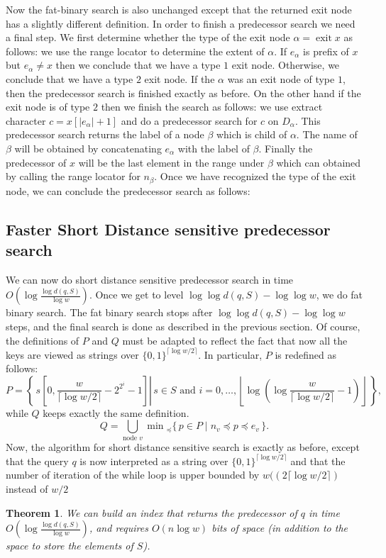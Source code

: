\documentclass[a4paper,11pt]{article}
\newtheorem{theorem}{Theorem}[section]
\newcommand{\?}{\mskip1.5mu}
\DeclareMathOperator{\exit}{exit}
\begin{document}
Now the fat-binary search is also unchanged except that the returned exit node has a slightly different definition. In order to finish a predecessor search we need a final step. We first determine whether the type of the exit node $\alpha=\exit x$ as follows: we use the range locator to determine the extent of $\alpha$. If $e_\alpha$ is prefix of $x$ but $e_\alpha\neq x$ then we conclude that we have a type $1$ exit node. Otherwise, we conclude that we have a type $2$ exit node. 
If the $\alpha$ was an exit node of type $1$, then the predecessor search is finished exactly as before. On the other hand if the exit node is of type $2$ then we finish the search as follows: we use extract character $c=x[|e_\alpha|+1]$ and do a predecessor search for $c$ on $D_\alpha$. This predecessor search returns the label of a node $\beta$ which is child of $\alpha$. The name of $\beta$ will be obtained by concatenating $e_\alpha$ with the label of $\beta$. Finally the predecessor of $x$ will be the last element in the range under $\beta$ which can obtained by calling the range locator for $n_\beta$. 
Once we have recognized the type of the exit node, we can conclude the predecessor search as follows:

\subsection{Faster Short Distance sensitive predecessor search}

We can now do short distance sensitive predecessor search 
in time $O(\log\frac{\log d(q, S)}{\log w})$. 
Once we get to level $\log\log d(q,S) - \log\log w$, we do fat 
binary search. The fat binary search stops after 
$\log\log d(q, S)-\log\log w$ steps, and the final search 
is done as described in the previous section. 
Of course, the definitions of $P$ and $Q$ must be adapted to 
reflect the fact that now all the keys are viewed as strings 
over $\{0, 1\}^{\lceil\log w/2\rceil}$. 
In particular, $P$ is redefined as follows:
\[
P = \left\{\,s\left[0,\frac{w}{\lceil\log w/2\rceil} - 2^{2^i} - 1\right] 
\left\vert \,s \in  S \text{ and }
	i=0,\dots,\left\lfloor\log(\log \frac{w}{\lceil\log w/2\rceil} - 1)
	\right\rfloor\,\right.\right\},
\]
while $Q$ keeps exactly the same definition. 
\[
Q=\bigcup_{\text{node $v$}}\min{}_\preceq\{\,p\in P\mid n_v\preceq p 
\preceq e_v\,\}.
\]
Now, the algorithm for short distance sensitive search is 
exactly as before, except that the query $q$ is now interpreted 
as a string over $\{0, 1\}^{\lceil\log w/2\rceil}$ and that the 
number of iteration of the while loop is upper bounded by 
$w((2\lceil\log w/2\rceil)$ instead of $w/2$
\begin{theorem}
\label{thm:pred-short}
We can build an index that returns the predecessor of $q$
in time $O\left(\log\frac{\log d(q,S)}{\log w}\right)$, 
and requires $O(n \log w )$
bits of space (in addition to the space to store the elements of $S$).
\end{theorem}
\end{document}
